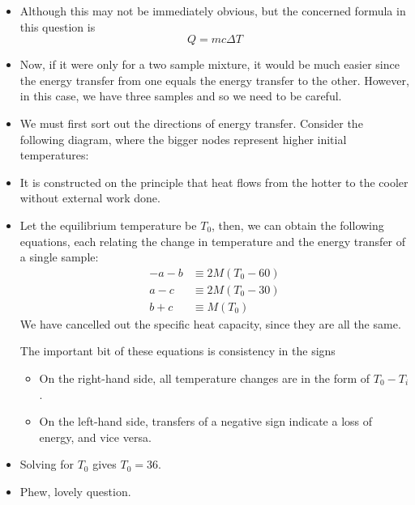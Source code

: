 \documentclass[a4paper,12pt]{article}
\begin{document}
\begin{itemize}
  \item Although this may not be immediately obvious, but the concerned formula in this question is
        $$Q = mc\Delta T$$
  \item Now, if it were only for a two sample mixture, it would be much easier since the energy transfer from one equals the energy transfer to the other. However, in this case, we have three samples and so we need to be careful.
  \item We must first sort out the directions of energy transfer. Consider the following diagram, where the bigger nodes represent higher initial temperatures:
        \begin{figure}[H]
          \centering

        \end{figure}
  \item It is constructed on the principle that heat flows from the hotter to the cooler without external work done.
  \item Let the equilibrium temperature be $T_0$, then, we can obtain the following equations, each relating the change in temperature and the energy transfer of a single sample:
        \begin{align*}
          -a-b & \equiv 2M(T_0 - 60) \\
          a-c  & \equiv 2M(T_0 - 30) \\
          b+c  & \equiv M(T_0)
        \end{align*}
        We have cancelled out the specific heat capacity, since they are all the same.

        The important bit of these equations is consistency in the signs
        \begin{itemize}
          \item On the right-hand side, all temperature changes are in the form of $T_0 - T_i$.
          \item On the left-hand side, transfers of a negative sign indicate a loss of energy, and vice versa.
        \end{itemize}

  \item Solving for $T_0$ gives $T_0 = 36$.
  \item Phew, lovely question.

\end{itemize}
\end{document}
